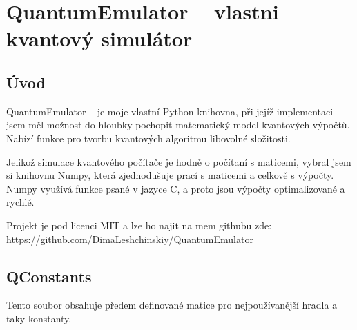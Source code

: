\documentclass[11pt]{article}
\begin{document}
\newpage

\section{QuantumEmulator – vlastni kvantový simulátor}
\label{sec:QuantumEmulator}
\subsection{Úvod}
QuantumEmulator – je moje vlastní Python knihovna, při jejíž implementaci jsem měl možnost do hloubky pochopit matematický model kvantových výpočtů.
Nabízí funkce pro tvorbu kvantových algoritmu libovolné složitosti.
\par Jelikož simulace kvantového počítače je hodně o počítaní s maticemi, vybral jsem si knihovnu Numpy, která zjednodušuje prací s maticemi a celkově s výpočty.
Numpy využívá funkce psané v jazyce C, a proto jsou výpočty optimalizované a rychlé.
\par Projekt je pod licenci MIT a lze ho najit na mem githubu zde: \url{https://github.com/DimaLeshchinskiy/QuantumEmulator}

\subsection{QConstants}
Tento soubor obsahuje předem definované matice pro nejpoužívanější hradla a taky konstanty.
\end{document}
